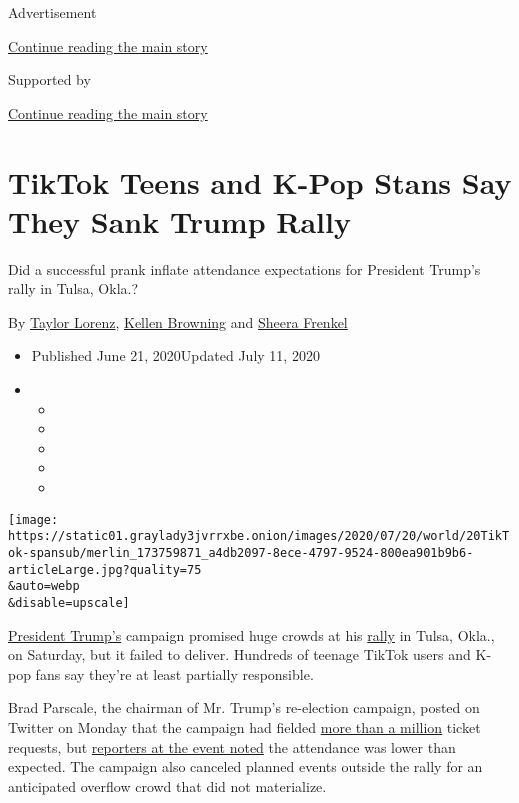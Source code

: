 Advertisement

\protect\hyperlink{after-top}{Continue reading the main story}

Supported by

\protect\hyperlink{after-sponsor}{Continue reading the main story}

\hypertarget{tiktok-teens-and-k-pop-stans-say-they-sank-trump-rally}{%
\section{TikTok Teens and K-Pop Stans Say They Sank Trump
Rally}\label{tiktok-teens-and-k-pop-stans-say-they-sank-trump-rally}}

Did a successful prank inflate attendance expectations for President
Trump's rally in Tulsa, Okla.?

By \href{https://www.nytimes3xbfgragh.onion/by/taylor-lorenz}{Taylor
Lorenz},
\href{https://www.nytimes3xbfgragh.onion/by/kellen-browning}{Kellen
Browning} and
\href{https://www.nytimes3xbfgragh.onion/by/sheera-frenkel}{Sheera
Frenkel}

\begin{itemize}
\item
  Published June 21, 2020Updated July 11, 2020
\item
  \begin{itemize}
  \item
  \item
  \item
  \item
  \item
  \end{itemize}
\end{itemize}

\texttt{[image: https://static01.graylady3jvrrxbe.onion/images/2020/07/20/world/20TikTok-spansub/merlin\_173759871\_a4db2097-8ece-4797-9524-800ea901b9b6-articleLarge.jpg?quality=75\\\&auto=webp\\\&disable=upscale]}

\href{https://www.nytimes3xbfgragh.onion/2020/06/22/style/trump-tulsa-tie.html}{President
Trump's} campaign promised huge crowds at his
\href{https://www.nytimes3xbfgragh.onion/2020/07/08/us/politics/trump-rally-portsmouth-new-hampshire.html}{rally}
in Tulsa, Okla., on Saturday, but it failed to deliver. Hundreds of
teenage TikTok users and K-pop fans say they're at least partially
responsible.

Brad Parscale, the chairman of Mr. Trump's re-election campaign, posted
on Twitter on Monday that the campaign had fielded
\href{https://twitter.com/parscale/status/1272543199647666176?s=20}{more
than a million} ticket requests, but
\href{https://twitter.com/AsteadWesley/status/1274465912951844866?s=20}{reporters
at the event noted} the attendance was lower than expected. The campaign
also canceled planned events outside the rally for an anticipated
overflow crowd that did not materialize.

